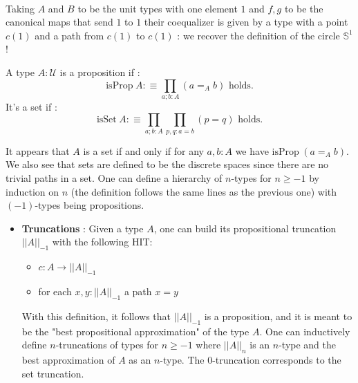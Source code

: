 \documentclass{report}
\begin{document}
\begin{itemize}
  \hfill 
  \begin{minipage}{.5\textwidth} 
    \begin{center}
      \label{fig:coequalizer}
    \end{center}
  \end{minipage}
  \\
  Taking $A$ and $B$ to be the unit types with one element $1$ and $f,g$ to be the canonical maps that send $1$ to $1$ their coequalizer is given by a type with a point $c(1)$ and a path from $c(1)$ to $c(1)$ : we recover the definition of the circle $\mathbb{S}^1$ !
\end{itemize}
\begin{mydef}
  A type $A : \mathcal{U}$ is a proposition if : 
  $$\mathrm{isProp}\hspace{3pt} A :\equiv \prod_{a;b : A} (a=_A b)\text{  holds.}$$
  It's a set if :
  $$\mathrm{isSet}\hspace{3pt}A :\equiv \prod_{a;b : A} \prod_{p,q : a=b} (p= q)\text{  holds.}$$ 
\end{mydef}
It appears that $A$ is a set if and only if for any $a,b :A$ we have $\mathrm{isProp}\hspace{3pt} (a=_A b)$. We also see that sets are defined to be the discrete spaces since there are no trivial paths in a set. One can define a hierarchy of $n$-types for $n\geq -1$ by induction on $n$ (the definition follows the same lines as the previous one) with $(-1)$-types being propositions.
\begin{itemize}
  \item \textbf{Truncations} : Given a type $A$, one can build its propositional truncation $||A||_{-1}$ with the following HIT:
    \begin{itemize}
      \item $c : A \rightarrow ||A||_{-1}$
      \item for each $x,y : ||A||_{-1}$ a path $x=y$
    \end{itemize}
    With this definition, it follows that $||A||_{-1}$ is a proposition, and it is meant to be the "best propositional approximation" of the type $A$. One can inductively define $n$-truncations of types for $n \geq -1$ where $||A||_{n}$ is an $n$-type and the best approximation of $A$ as an $n$-type. The $0$-truncation corresponds to the set truncation. 
\end{itemize} 
\end{document}
